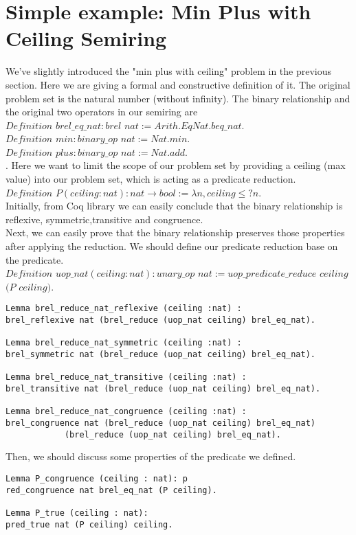 \documentclass[a4paper,12pt,twoside,openright]{report}
\begin{document}
\section{Simple example: Min Plus with Ceiling Semiring}
We've slightly introduced the "min plus with ceiling" problem in the previous section. Here we are giving a formal and constructive definition of it. The original problem set is the natural number (without infinity).
The binary relationship and the original two operators in our semiring are\\
$Definition$ $brel\_eq\_nat  : brel$ $nat  := Arith.EqNat.beq\_nat.$\\
$Definition$ $min :binary\_op $ $ nat:= Nat.min.$\\
$Definition$ $plus :binary\_op $ $ nat:= Nat.add.$\\.
Here we want to limit the scope of our problem set by providing a ceiling (max value) into our problem set, which is acting as a predicate reduction.\\
$Definition$ $P (ceiling : nat): nat \rightarrow bool := \lambda n, ceiling \leq? n.$\\
Initially, from Coq library we can easily conclude that the binary relationship is reflexive, symmetric,transitive and congruence.\\
Next, we can easily prove that the binary relationship preserves those properties after applying the reduction.
We should define our predicate reduction base on the predicate.\\
$Definition$ $uop\_nat (ceiling : nat) : unary\_op$ $nat := uop\_predicate\_reduce$ $ceiling$ $(P$ $ceiling).$
\begin{lstlisting}
Lemma brel_reduce_nat_reflexive (ceiling :nat) : 
brel_reflexive nat (brel_reduce (uop_nat ceiling) brel_eq_nat).

Lemma brel_reduce_nat_symmetric (ceiling :nat) : 
brel_symmetric nat (brel_reduce (uop_nat ceiling) brel_eq_nat).

Lemma brel_reduce_nat_transitive (ceiling :nat) : 
brel_transitive nat (brel_reduce (uop_nat ceiling) brel_eq_nat).

Lemma brel_reduce_nat_congruence (ceiling :nat) : 
brel_congruence nat (brel_reduce (uop_nat ceiling) brel_eq_nat) 
		    (brel_reduce (uop_nat ceiling) brel_eq_nat).
\end{lstlisting}
Then, we should discuss some properties of the predicate we defined.
\begin{lstlisting}
Lemma P_congruence (ceiling : nat): p
red_congruence nat brel_eq_nat (P ceiling).

Lemma P_true (ceiling : nat): 
pred_true nat (P ceiling) ceiling.
\end{lstlisting}
\end{document}
